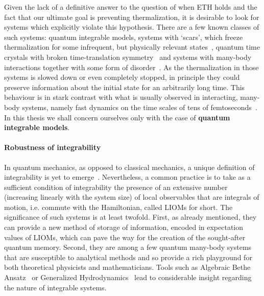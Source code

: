 Given the lack of a definitive answer to the question of when ETH holds and the fact that our 
ultimate goal is preventing thermalization, it is desirable to look for systems
which explicitly violate this hypothesis. There are a few known classes of such systems:
quantum integrable models, systems with `scars', which freeze thermalization for
some infrequent, but physically relevant states~\autocite{Turner2018a,Turner2018}, quantum time crystals with
broken time-translation symmetry~\autocite{Wilczek2012,Sacha2017} and systems with many-body interactions together
with some form of disorder~\autocite{Basko_2006}. As the thermalization in those systems is slowed down or even
completely stopped, in principle they could preserve information about the initial state for an arbitrarily long time. 
This behaviour is in stark contrast with what is usually observed in interacting, many-body systems, namely fast
dynamics on the time scales of tens of femtoseconds~\autocite{DalConte2015}.
In this thesis we shall concern ourselves only with the case of \textbf{quantum integrable models}.

\paragraph{Robustness of integrability} 
In quantum mechanics, as opposed to classical mechanics, a unique definition of integrability
is yet to emerge~\autocite{Caux2011,Yuzbashyan2013}. Nevertheless, a common practice is to take as a sufficient condition of
integrability the presence of an extensive number (increasing linearly with the system size) of local observables
that are integrals of motion, i.e. commute with the Hamiltonian, called LIOMs for short. The significance of such
systems is at least twofold. 
First, as already mentioned, they can provide a new method of storage of information, encoded in expectation values
of LIOMs, which can pave the way for the creation of the sought-after quantum memory.
Second, they are among a few quantum many-body systems that are susceptible to analytical methods and so provide
a rich playground for both theoretical physicists and mathematicians. Tools such as Algebraic Bethe
Ansatz~\autocite{Faddeev1995,Faddeev1996,Korepin1993} or Generalized Hydrodynamics~\autocite{Agrawal2020,Friedman2020,
Bertini2021,Bastianello2021,Bulchandani2021} lead to considerable insight regarding the nature of integrable systems.

